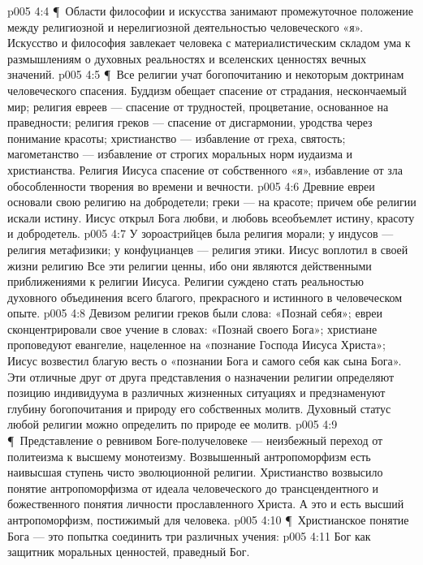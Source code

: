 \vs p005 4:4 \P\ Области философии и искусства занимают промежуточное положение между религиозной и нерелигиозной деятельностью человеческого «я». Искусство и философия завлекает человека с материалистическим складом ума к размышлениям о духовных реальностях и вселенских ценностях вечных значений.
\vs p005 4:5 \P\ Все религии учат богопочитанию и некоторым доктринам человеческого спасения. Буддизм обещает спасение от страдания, нескончаемый мир; религия евреев --- спасение от трудностей, процветание, основанное на праведности; религия греков --- спасение от дисгармонии, уродства через понимание красоты; христианство --- избавление от греха, святость; магометанство --- избавление от строгих моральных норм иудаизма и христианства. Религия Иисуса  спасение от собственного «я», избавление от зла обособленности творения во времени и вечности.
\vs p005 4:6 Древние евреи основали свою религию на добродетели; греки --- на красоте; причем обе религии искали истину. Иисус открыл Бога любви, и любовь всеобъемлет истину, красоту и добродетель.
\vs p005 4:7 У зороастрийцев была религия морали; у индусов --- религия метафизики; у конфуцианцев --- религия этики. Иисус воплотил в своей жизни религию  Все эти религии ценны, ибо они являются действенными приближениями к религии Иисуса. Религии суждено стать реальностью духовного объединения всего благого, прекрасного и истинного в человеческом опыте.
\vs p005 4:8 Девизом религии греков были слова: «Познай себя»; евреи сконцентрировали свое учение в словах: «Познай своего Бога»; христиане проповедуют евангелие, нацеленное на «познание Господа Иисуса Христа»; Иисус возвестил благую весть о «познании Бога и самого себя как сына Бога». Эти отличные друг от друга представления о назначении религии определяют позицию индивидуума в различных жизненных ситуациях и предзнаменуют глубину богопочитания и природу его собственных молитв. Духовный статус любой религии можно определить по природе ее молитв.
\vs p005 4:9 \P\ Представление о ревнивом Боге\hyp{}получеловеке --- неизбежный переход от политеизма к высшему монотеизму. Возвышенный антропоморфизм есть наивысшая ступень чисто эволюционной религии. Христианство возвысило понятие антропоморфизма от идеала человеческого до трансцендентного и божественного понятия личности прославленного Христа. А это и есть высший антропоморфизм, постижимый для человека.
\vs p005 4:10 \P\ Христианское понятие Бога --- это попытка соединить три различных учения:
\vs p005 4:11 \bibnobreakspace {} Бог как защитник моральных ценностей, праведный Бог.
